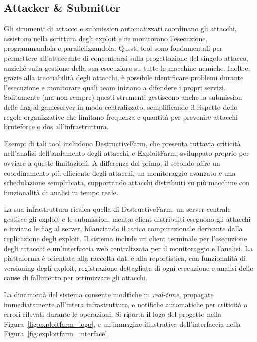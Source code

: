\subsection{Attacker \& Submitter}

Gli strumenti di attacco e submission automatizzati coordinano gli attacchi, assistono nella scrittura degli exploit e ne monitorano l'esecuzione, programmandola e parallelizzandola. Questi tool sono fondamentali per permettere all'attaccante di concentrarsi sulla progettazione del singolo attacco, anziché sulla gestione della sua esecuzione su tutte le macchine nemiche. Inoltre, grazie alla tracciabilità degli attacchi, è possibile identificare problemi durante l'esecuzione e monitorare quali team iniziano a difendere i propri servizi. Solitamente (ma non sempre) questi strumenti gestiscono anche la submission delle flag al gameserver in modo centralizzato, semplificando il rispetto delle regole organizzative che limitano frequenza e quantità per prevenire attacchi bruteforce o \gls{dos} all'infrastruttura.

Esempi di tali tool includono DestructiveFarm, che presenta tuttavia criticità nell'analisi dell'andamento degli attacchi, e ExploitFarm, sviluppato proprio per ovviare a queste limitazioni. A differenza del primo, il secondo offre un coordinamento più efficiente degli attacchi, un monitoraggio avanzato e una schedulazione semplificata, supportando attacchi distribuiti su più macchine con funzionalità di analisi in tempo reale.

La sua infrastruttura ricalca quella di DestructiveFarm: un server centrale gestisce gli exploit e le submission, mentre client distribuiti eseguono gli attacchi e inviano le flag al server, bilanciando il carico computazionale derivante dalla replicazione degli exploit. Il sistema include un client terminale per l'esecuzione degli attacchi e un'interfaccia web centralizzata per il monitoraggio e l'analisi. La piattaforma è orientata alla raccolta dati e alla reportistica, con funzionalità di versioning degli exploit, registrazione dettagliata di ogni esecuzione e analisi delle cause di fallimento per ottimizzare gli attacchi.

La dinamicità del sistema consente modifiche in \textit{real-time}, propagate immediatamente all'intera infrastruttura, e notifiche automatiche per criticità o errori rilevati durante le operazioni.
Si riporta il logo del progetto nella Figura~\ref{fig:exploitfarm_logo}, e un'immagine illustrativa dell'interfaccia nella Figura~\ref{fig:exploitfarm_interface}.

